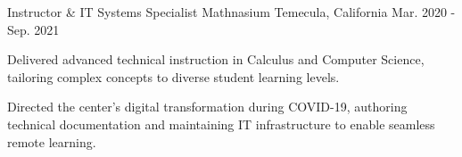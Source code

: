 \begin{cventries}
  \cventry
    {Instructor \& IT Systems Specialist} 
    {Mathnasium} 
    {Temecula, California} 
    {Mar. 2020 - Sep. 2021} 
    {
      \begin{cvitems} 
        \item {Delivered advanced technical instruction in Calculus and Computer Science, tailoring complex concepts to diverse student learning levels.}
        \item {Directed the center's digital transformation during COVID-19, authoring technical documentation and maintaining IT infrastructure to enable seamless remote learning.}
      \end{cvitems}
    }

\end{cventries}